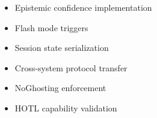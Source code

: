 \documentclass[11pt,a4paper]{article}
\begin{document}
\begin{itemize}
    \item[$\square$] Epistemic confidence implementation
    \item[$\square$] Flash mode triggers
    \item[$\square$] Session state serialization
    \item[$\square$] Cross-system protocol transfer
    \item[$\square$] NoGhosting enforcement
    \item[$\square$] HOTL capability validation
\end{itemize}
\end{document}
